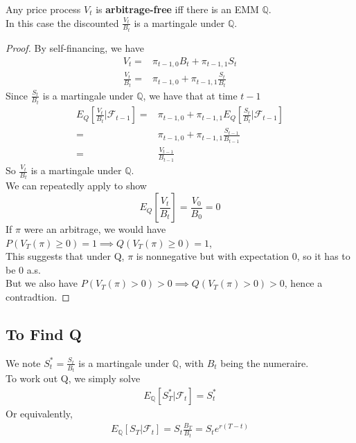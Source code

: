     \begin{theorem}
        Any price process $V_t$ is \textbf{arbitrage-free} iff there is an EMM $\mathbb{Q}$. \\
        In this case the discounted $\frac{V_t}{B_t}$ is a martingale under $\mathbb{Q}$.
    \end{theorem}
    \begin{proof}
        By self-financing, we have
        \begin{align*}
            V_t =& \pi_{t-1, 0} B_t + \pi_{t-1, 1} S_t \\
            \frac{V_t}{B_t} =& \pi_{t-1, 0} + \pi_{t-1, 1} \frac{S_t}{B_t}
        \end{align*}
        Since $\frac{S_t}{B_t}$ is a martingale under $\mathbb{Q}$, 
        we have that at time $t-1$
        \begin{align*}
            E_Q \left[\frac{V_t}{B_t} | \mathcal{F}_{t-1}\right] =& \pi_{t-1, 0} + 
            \pi_{t-1, 1} E_Q \left[\frac{S_t}{B_t} | \mathcal{F}_{t-1}\right] \\
            =& \pi_{t-1, 0} + \pi_{t-1, 1} \frac{S_{t-1}}{B_{t-1}} \\
            =& \frac{V_{t-1}}{B_{t-1}}
        \end{align*}
        So $\frac{V_t}{B_t}$ is a martingale under $\mathbb{Q}$.\\
        We can repeatedly apply to show 
        $$
         E_Q \left[\frac{V_t}{B_t} \right] = \frac{V_0}{B_0} = 0
        $$
        If $\pi$ were an arbitrage, we would have $ P(V_T(\pi) \geq 0) = 1 \implies 
        Q(V_T(\pi) \geq 0) = 1$,\\
        This suggests that under Q, $\pi$ is nonnegative but with expectation 0, so it has to be 0 a.s.\\
        But we also have $ P(V_T(\pi) > 0) > 0 \implies Q(V_T(\pi) > 0) > 0$, hence a contradtion.
    \end{proof}

\subsection{To Find Q}
We note $S_t^* = \frac{S_t}{B_t}$ is a martingale under $\mathbb{Q}$, with $B_t$ being the numeraire.\\
To work out Q, we simply solve 
\begin{align*}
    E_{\mathbb{Q}}[S_T^* | \mathcal{F}_t] = S_t^*
\end{align*}
Or equivalently,
\begin{align*}
    E_{\mathbb{Q}}[S_T | \mathcal{F}_t] = S_t \frac{B_T}{B_t} = S_t e^{r(T-t)}
\end{align*}
